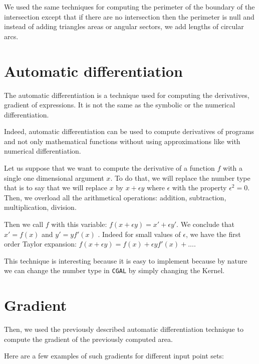 We used the same techniques for computing the perimeter of the boundary of the
intersection except that if there are no intersection then the perimeter is null
and instead of adding triangles areas or angular sectors, we add lengths of
circular arcs.


\section{Automatic differentiation}

The automatic differentiation is a technique used for computing the derivatives,
gradient of expressions. It is not the same as the symbolic or the numerical
differentiation.

Indeed, automatic differentiation can be used to compute derivatives of programs
and not only mathematical functions without using approximations like with
numerical differentiation.

Let us suppose that we want to compute the derivative of a function $ f $ with a
single one dimensional argument $ x $. To do that, we will replace the number
type that is to say that we will replace $ x $ by $ x + \epsilon y $ where $
\epsilon $ with the property $ \epsilon^2 = 0 $. Then, we overload all the
arithmetical operations: addition, subtraction, multiplication, division.

Then we call $ f $ with this variable: $ f(x + \epsilon y) = x' + \epsilon y'
$. We conclude that $ x' = f(x) $ and $ y' = y f'(x) $ . Indeed for small values
of $ \epsilon $, we have the first order Taylor expansion: $ f(x + \epsilon y) =
f(x) + \epsilon y f'(x) + ... $.

This technique is interesting because it is easy to implement because by nature
we can change the number type in \texttt{CGAL} by simply changing the Kernel.


\section{Gradient}

Then, we used the previously described automatic differentiation technique to
compute the gradient of the previously computed area.

Here are a few examples of such gradients for different input point sets:

